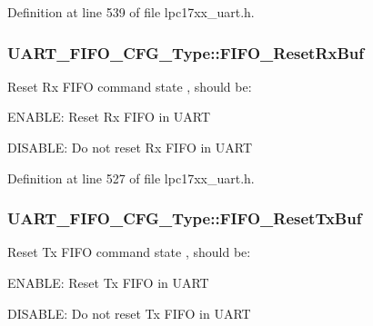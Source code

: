 Definition at line 539 of file lpc17xx\+\_\+uart.\+h.

\subsubsection[{\texorpdfstring{F\+I\+F\+O\+\_\+\+Reset\+Rx\+Buf}{FIFO_ResetRxBuf}}]{ U\+A\+R\+T\+\_\+\+F\+I\+F\+O\+\_\+\+C\+F\+G\+\_\+\+Type\+::\+F\+I\+F\+O\+\_\+\+Reset\+Rx\+Buf}\hypertarget{struct_u_a_r_t___f_i_f_o___c_f_g___type_a716224e98507c50ac54940ebfc51be6f}{}\label{struct_u_a_r_t___f_i_f_o___c_f_g___type_a716224e98507c50ac54940ebfc51be6f}
Reset Rx F\+I\+FO command state , should be\+:
\begin{DoxyItemize}
\item E\+N\+A\+B\+LE\+: Reset Rx F\+I\+FO in U\+A\+RT
\item D\+I\+S\+A\+B\+LE\+: Do not reset Rx F\+I\+FO in U\+A\+RT 
\end{DoxyItemize}

Definition at line 527 of file lpc17xx\+\_\+uart.\+h.

\subsubsection[{\texorpdfstring{F\+I\+F\+O\+\_\+\+Reset\+Tx\+Buf}{FIFO_ResetTxBuf}}]{ U\+A\+R\+T\+\_\+\+F\+I\+F\+O\+\_\+\+C\+F\+G\+\_\+\+Type\+::\+F\+I\+F\+O\+\_\+\+Reset\+Tx\+Buf}\hypertarget{struct_u_a_r_t___f_i_f_o___c_f_g___type_a21d70658d3e3b61667dd3bc27a7817f2}{}\label{struct_u_a_r_t___f_i_f_o___c_f_g___type_a21d70658d3e3b61667dd3bc27a7817f2}
Reset Tx F\+I\+FO command state , should be\+:
\begin{DoxyItemize}
\item E\+N\+A\+B\+LE\+: Reset Tx F\+I\+FO in U\+A\+RT
\item D\+I\+S\+A\+B\+LE\+: Do not reset Tx F\+I\+FO in U\+A\+RT 
\end{DoxyItemize}

